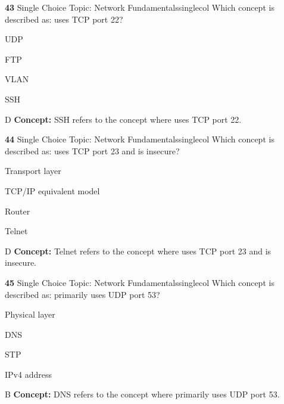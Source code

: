 \documentclass[10pt,a4paper]{article}
\begin{document}
\begin{qcard}{\color{white}\textbf{43} \hfill \small Single Choice \textbar{} Topic: Network Fundamentals}{singlecol}
Which concept is described as: uses TCP port 22?

\begin{qoptions}
\item UDP
\item FTP
\item VLAN
\item SSH
\end{qoptions}
\begin{explainbox}{D}
\textbf{Concept:} SSH refers to the concept where uses TCP port 22.
\end{explainbox}
\end{qcard}

\begin{qcard}{\color{white}\textbf{44} \hfill \small Single Choice \textbar{} Topic: Network Fundamentals}{singlecol}
Which concept is described as: uses TCP port 23 and is insecure?

\begin{qoptions}
\item Transport layer
\item TCP/IP equivalent model
\item Router
\item Telnet
\end{qoptions}
\begin{explainbox}{D}
\textbf{Concept:} Telnet refers to the concept where uses TCP port 23 and is insecure.
\end{explainbox}
\end{qcard}

\begin{qcard}{\color{white}\textbf{45} \hfill \small Single Choice \textbar{} Topic: Network Fundamentals}{singlecol}
Which concept is described as: primarily uses UDP port 53?

\begin{qoptions}
\item Physical layer
\item DNS
\item STP
\item IPv4 address
\end{qoptions}
\begin{explainbox}{B}
\textbf{Concept:} DNS refers to the concept where primarily uses UDP port 53.
\end{explainbox}
\end{qcard}
\end{document}
